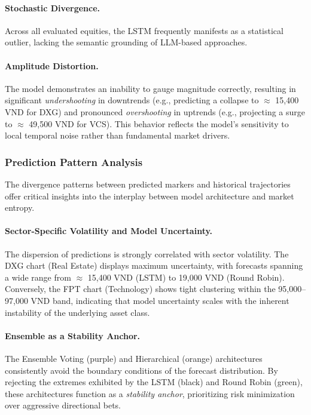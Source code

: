 \documentclass{ieeeaccess}
\begin{document}
\paragraph{Stochastic Divergence.}
Across all evaluated equities, the LSTM frequently manifests as a statistical outlier, lacking the semantic grounding of LLM-based approaches.

\paragraph{Amplitude Distortion.}
The model demonstrates an inability to gauge magnitude correctly, resulting in significant \textit{undershooting} in downtrends (e.g., predicting a collapse to $\approx$ 15,400 VND for DXG) and pronounced \textit{overshooting} in uptrends (e.g., projecting a surge to $\approx$ 49,500 VND for VCS). This behavior reflects the model's sensitivity to local temporal noise rather than fundamental market drivers.

\subsubsection{Prediction Pattern Analysis}
The divergence patterns between predicted markers and historical trajectories offer critical insights into the interplay between model architecture and market entropy.

\paragraph{Sector-Specific Volatility and Model Uncertainty.}
The dispersion of predictions is strongly correlated with sector volatility. The DXG chart (Real Estate) displays maximum uncertainty, with forecasts spanning a wide range from $\approx$ 15,400 VND (LSTM) to 19,000 VND (Round Robin). Conversely, the FPT chart (Technology) shows tight clustering within the 95,000--97,000 VND band, indicating that model uncertainty scales with the inherent instability of the underlying asset class.

\paragraph{Ensemble as a Stability Anchor.}
The Ensemble Voting (purple) and Hierarchical (orange) architectures consistently avoid the boundary conditions of the forecast distribution. By rejecting the extremes exhibited by the LSTM (black) and Round Robin (green), these architectures function as a \textit{stability anchor}, prioritizing risk minimization over aggressive directional bets.
\end{document}
